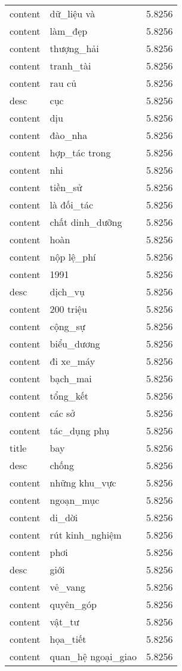 \documentclass{article}
\begin{document}
\begin{tabular}{lll}
content & dữ\_liệu và & 5.8256\\
content & làm\_đẹp & 5.8256\\
content & thượng\_hải & 5.8256\\
content & tranh\_tài & 5.8256\\
content & rau củ & 5.8256\\
desc & cục & 5.8256\\
content & dịu & 5.8256\\
content & đào\_nha & 5.8256\\
content & hợp\_tác trong & 5.8256\\
content & nhi & 5.8256\\
content & tiền\_sử & 5.8256\\
content & là đối\_tác & 5.8256\\
content & chất dinh\_dưỡng & 5.8256\\
content & hoàn & 5.8256\\
content & nộp lệ\_phí & 5.8256\\
content & 1991 & 5.8256\\
desc & dịch\_vụ & 5.8256\\
content & 200 triệu & 5.8256\\
content & cộng\_sự & 5.8256\\
content & biểu\_dương & 5.8256\\
content & đi xe\_máy & 5.8256\\
content & bạch\_mai & 5.8256\\
content & tổng\_kết & 5.8256\\
content & các sở & 5.8256\\
content & tác\_dụng phụ & 5.8256\\
title & bay & 5.8256\\
desc & chống & 5.8256\\
content & những khu\_vực & 5.8256\\
content & ngoạn\_mục & 5.8256\\
content & di\_dời & 5.8256\\
content & rút kinh\_nghiệm & 5.8256\\
content & phơi & 5.8256\\
desc & giới & 5.8256\\
content & vẻ\_vang & 5.8256\\
content & quyên\_góp & 5.8256\\
content & vật\_tư & 5.8256\\
content & họa\_tiết & 5.8256\\
content & quan\_hệ ngoại\_giao & 5.8256\\

\end{tabular}
\end{document}
